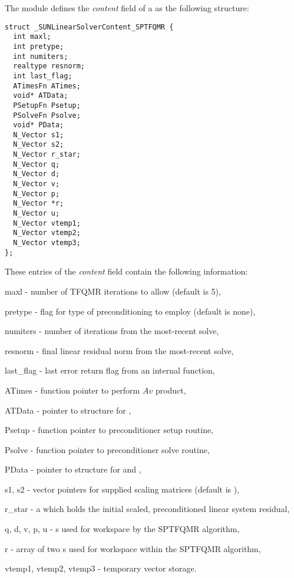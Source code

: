 The {\sunlinsolsptfqmr} module defines the \textit{content} field of a
 as the following structure:
\begin{verbatim}
struct _SUNLinearSolverContent_SPTFQMR {
  int maxl;
  int pretype;
  int numiters;
  realtype resnorm;
  int last_flag;
  ATimesFn ATimes;
  void* ATData;
  PSetupFn Psetup;
  PSolveFn Psolve;
  void* PData;
  N_Vector s1;
  N_Vector s2;
  N_Vector r_star;
  N_Vector q;
  N_Vector d;
  N_Vector v;
  N_Vector p;
  N_Vector *r;
  N_Vector u;
  N_Vector vtemp1;
  N_Vector vtemp2;
  N_Vector vtemp3;
};
\end{verbatim}
These entries of the \emph{content} field contain the following
information:
\begin{args}
  \item[maxl] - number of TFQMR iterations to allow (default is 5),
  \item[pretype] - flag for type of preconditioning to employ
    (default is none),
  \item[numiters] - number of iterations from the most-recent solve,
  \item[resnorm] - final linear residual norm from the most-recent solve,
  \item[last\_flag] - last error return flag from an internal function,
  \item[ATimes] - function pointer to perform $Av$ product,
  \item[ATData] - pointer to structure for ,
  \item[Psetup] - function pointer to preconditioner setup routine,
  \item[Psolve] - function pointer to preconditioner solve routine,
  \item[PData] - pointer to structure for  and ,
  \item[s1, s2] - vector pointers for supplied scaling matrices
    (default is ),
  \item[r\_star] - a {\nvector} which holds the initial scaled,
    preconditioned linear system residual,
  \item[q, d, v, p, u] - {\nvector}s used for workspace by the SPTFQMR
    algorithm,
  \item [r] - array of two {\nvector}s used for workspace within the
    SPTFQMR algorithm,
  \item[vtemp1, vtemp2, vtemp3] - temporary vector storage.
\end{args}
